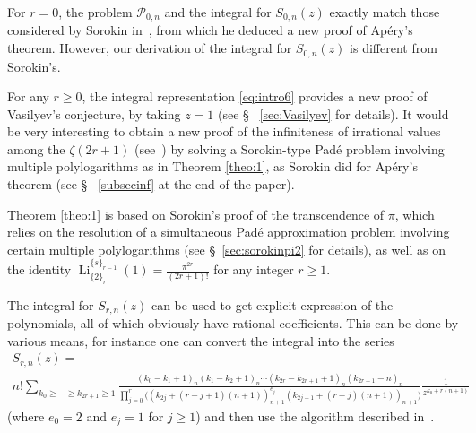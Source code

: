 \documentclass[reqno,12pt]{amsart}
\numberwithin{equation}{section}
\theoremstyle{remark}
\def\li{\operatorname{Li}}
\begin{document}
For $r=0$, the problem $\mathcal{P}_{0,n}$ and the integral for  
$S_{0,n}(z)$  exactly match those considered by Sorokin in~\cite{sorokin2}, from which he deduced 
a new proof of Ap\'ery's theorem. However, our derivation of the integral for 
$S_{0,n}(z)$ is different from Sorokin's.


\bigskip

For any $r\geq 0$, the integral representation \eqref{eq:intro6}  provides a new proof of 
Vasilyev's conjecture, by taking $z=1$ (see \S~ \ref{sec:Vasilyev} for details). It 
would be very interesting 
to obtain a new proof of the infiniteness of irrational values among the $\zeta(2r+1)$ (see~\cite{BR, rivoal}) 
by  solving a Sorokin-type Pad\'e problem involving multiple polylogarithms as in Theorem \ref{theo:1}, as Sorokin 
did \cite{sorokin2} for Ap\'ery's 
theorem  (see \S~ \ref{subsecinf} at the end of the paper).

\medskip

 Theorem \ref{theo:1} is based on Sorokin's proof \cite{sorokin1}  of the 
transcendence of $\pi$, which relies  on the resolution of a simultaneous Pad\'e approximation 
problem involving certain multiple 
polylogarithms (see \S~\ref{sec:sorokinpi2} for details), as well as on the identity 
$\li_{\{2\}_{r}}^{\{s\}_{r-1}}(1)=\frac{\pi^{2r}}{(2r+1)!}$ for any integer $r\ge 1$.


\medskip


The integral for $S_{r,n}(z)$ can be used to get explicit expression of the polynomials, all of which obviously 
  have rational coefficients. This can be done by various means, for instance one can convert 
the integral into the series
\begin{multline*}
S_{r,n}(z)=
\\n!\!\!\sum_{k_0\ge \cdots \ge k_{2r+1}\ge 1} \frac{(k_0-k_1+1)_n(k_1-k_2+1)_n\cdots 
(k_{2r}-k_{2r+1}+1)_n(k_{2r+1}-n)_n}{\displaystyle \prod_{j=0}^r 
\big((k_{2j}+(r-j+1)(n+1))_{n+1}^{e_j}(k_{2j+1}+(r-j)(n+1))_{n+1}\big)} \frac1{z^{k_0+r(n+1)}}
\end{multline*}
(where $e_0=2$ and $e_j=1$ for $j\ge 1$) and then use the algorithm described in~\cite{crefiri}.


\bigskip
\end{document}
